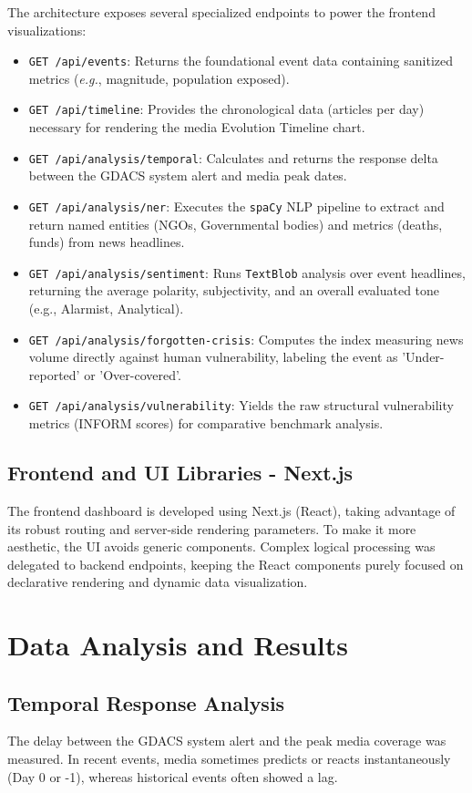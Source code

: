 \documentclass[11pt,a4paper]{article}
\begin{document}
The architecture exposes several specialized endpoints to power the frontend visualizations:
\begin{itemize}
    \item \texttt{GET /api/events}: Returns the foundational event data containing sanitized metrics (\textit{e.g.}, magnitude, population exposed).
    \item \texttt{GET /api/timeline}: Provides the chronological data (articles per day) necessary for rendering the media Evolution Timeline chart.
    \item \texttt{GET /api/analysis/temporal}: Calculates and returns the response delta between the GDACS system alert and media peak dates.
    \item \texttt{GET /api/analysis/ner}: Executes the \texttt{spaCy} NLP pipeline to extract and return named entities (NGOs, Governmental bodies) and metrics (deaths, funds) from news headlines.
    \item \texttt{GET /api/analysis/sentiment}: Runs \texttt{TextBlob} analysis over event headlines, returning the average polarity, subjectivity, and an overall evaluated tone (e.g., Alarmist, Analytical).
    \item \texttt{GET /api/analysis/forgotten-crisis}: Computes the index measuring news volume directly against human vulnerability, labeling the event as 'Under-reported' or 'Over-covered'.
    \item \texttt{GET /api/analysis/vulnerability}: Yields the raw structural vulnerability metrics (INFORM scores) for comparative benchmark analysis.
\end{itemize}

\subsection{Frontend and UI Libraries - Next.js}
The frontend dashboard is developed using Next.js (React), taking advantage of its robust routing and server-side rendering parameters. To make it more aesthetic, the UI avoids generic components. Complex logical processing was delegated to backend endpoints, keeping the React components purely focused on declarative rendering and dynamic data visualization.

\section{Data Analysis and Results}

\subsection{Temporal Response Analysis}
The delay between the GDACS system alert and the peak media coverage was measured. In recent events, media sometimes predicts or reacts instantaneously (Day 0 or -1), whereas historical events often showed a lag.
\end{document}
